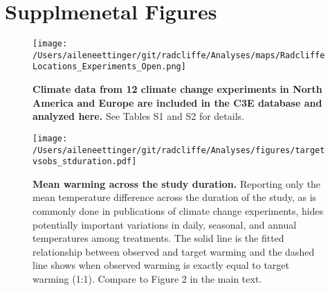 \documentclass{article}
\begin{document}
\clearpage
\section* {Supplmenetal Figures}
\begin{figure}[p]
\centering
\texttt{[image: /Users/aileneettinger/git/radcliffe/Analyses/maps/RadcliffeLocations\_Experiments\_Open.png]} 
\caption{\textbf{Climate data from 12 climate change experiments in North America and Europe are included in the C3E database and analyzed here.} See Tables S1 and S2 for details.} 
 \label{fig:map}
 \end{figure}
\clearpage
\begin{figure}[p]
\centering
\texttt{[image: /Users/aileneettinger/git/radcliffe/Analyses/figures/targetvsobs\_stduration.pdf]} 
\caption{\textbf{Mean warming across the study duration.} Reporting only the mean temperature difference across the duration of the study, as is commonly done in publications of climate change experiments, hides potentially important variations in daily, seasonal, and annual temperatures among treatments. The solid line is the fitted relationship between observed and target warming and the dashed line shows when observed warming is exactly equal to target warming (1:1). Compare to Figure 2 in the main text. } 
 \label{fig:targetvsobs}
 \end{figure}


\end{document}
